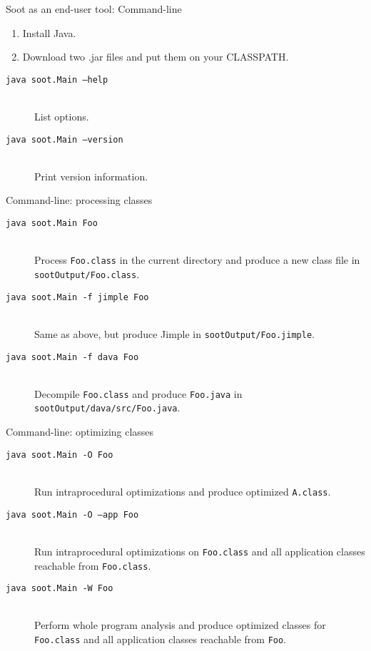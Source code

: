 \begin{slide}{Soot as an end-user tool: Command-line}
\begin{enumerate}
\item Install Java.
\item Download two .jar files and put them on your CLASSPATH.
\end{enumerate}
\begin{description}
\item[\texttt{java soot.Main --help}] \hspace{1in} \\
 List options.
\item[\texttt{java soot.Main --version}] \hspace{1in} \\
 Print version information.
\end{description}
\end{slide}

\begin{slide}{Command-line: processing classes}
\begin{description}
\item[\texttt{java soot.Main Foo}] \hspace{1in} \\   
 Process \texttt{Foo.class} in the current directory
 and produce a new class file in
\texttt{sootOutput/Foo.class}.
\item[\texttt{java soot.Main -f jimple Foo}] \hspace{1in} \\
Same as above, but produce Jimple in  \texttt{sootOutput/Foo.jimple}.
\item[\texttt{java soot.Main -f dava Foo}] \hspace{1in} \\
Decompile \texttt{Foo.class} and produce \texttt{Foo.java} in 
\texttt{sootOutput/dava/src/Foo.java}.
\end{description}
\end{slide}

\begin{slide}{Command-line: optimizing classes}
\begin{description}
\item[\texttt{java soot.Main -O Foo}] \hspace{1in} \\
Run intraprocedural optimizations and produce optimized {\tt A.class}.
\item[\texttt{java soot.Main -O --app Foo}] \hspace{1in} \\
Run intraprocedural optimizations on \texttt{Foo.class} and all
application classes reachable from {\tt Foo.class}. 
\item[\texttt{java soot.Main -W Foo}] \hspace{1in} \\
Perform whole program analysis and produce optimized classes for \texttt{Foo.class} and all application classes reachable from {\tt Foo}.
\end{description}
\end{slide}

